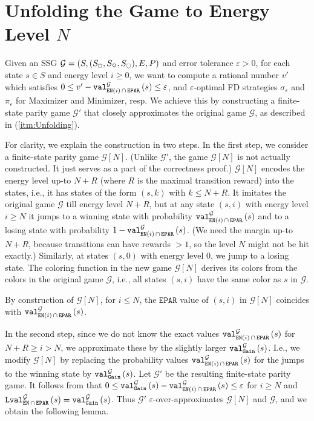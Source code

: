 \documentclass[a4paper,UKenglish,cleveref,autoref,thm-restate]{lipics-v2021}
\DeclareMathOperator{\Gain}{\mathtt{Gain}}
\newcommand{\Eparity}{\mathtt{EPAR}}
\newcommand{\en}{\mathtt{EN}}
\newcommand{\+}[1]{\mathbb{#1}}
\newcommand{\?}[1]{\mathcal{#1}}
\newcommand{\rsymbol}{\ocircle}
\newcommand{\zsymbol}{\Box}
\newcommand{\osymbol}{\Diamond}
\newcommand{\zstates}{\states_\zsymbol}
\newcommand{\rstates}{\states_\rsymbol}
\newcommand{\ostates}{\states_\osymbol}
\newcommand{\eps}{\varepsilon}
\newcommand{\lrb}[1]{\left[#1\right]}
\newcommand{\lrc}[1]{\left(#1\right)}
\newcommand{\tuple}[1]{\lrc{#1}}
\newcommand{\game}{{\mathcal G}}
\newcommand{\gametuple}{\tuple{\states,(\zstates,\ostates,\rstates),\transition,\probp}}
\newcommand{\states}{S}
\newcommand{\s}{s}
\newcommand{\transition}{{E}}
\newcommand{\probp}{P}
\newcommand{\zstrat}{\sigma}
\newcommand{\ostrat}{\pi}
\begin{document}
\section{Unfolding the Game to Energy Level  \texorpdfstring{$N$}{N}}\label{sec: Unfolding till N}

Given an SSG $\game = \gametuple$ and error tolerance $\eps >0$,
for each state $\s \in \states$ and energy level $i \ge 0$,
we want to compute a rational number
$v'$ which satisfies
$0 \le v'- \valueof[\game][\en(i)\, \cap \, \Eparity]{\s} \le \eps$,
and $\eps$-optimal FD strategies $\zstrat_\eps$ and $\ostrat_\eps$ for
Maximizer and Minimizer, resp.
We achieve this by constructing a finite-state parity game $\game'$
that closely approximates the original game $\game$,
as described in (\cref{itm:Unfolding}).

For clarity, we explain the construction in two steps.
In the first step, we consider a finite-state parity game $\game\lrb{N}$.
(Unlike $\game'$, the game $\game\lrb{N}$ is not actually constructed.
It just serves as a part of the correctness proof.)
$\game\lrb{N}$ encodes the energy level up-to $N+R$ (where $R$ is the maximal
transition reward) into the states, i.e., it has states
of the form $(\s,k)$ with $k \le N+R$.
It imitates the original game $\game$ till energy level $N+R$,
but at any state $\lrc{\s,i}$ with energy level $i \ge N$ it jumps
to a winning state with probability $\valueof[\game][\en(i)\, \cap \,
\Eparity]{\s}$ and to a losing state with probability
$1-\valueof[\game][\en(i)\, \cap \, \Eparity]{\s}$.
(We need the margin up-to $N+R$, because transitions can have rewards $>1$, so
the level $N$ might not be hit exactly.)
Similarly, at states $\lrc{\s,0}$ with energy level $0$,
we jump to a losing state.
The coloring function in the new game $\game\lrb{N}$
derives its colors from the colors in the original game
$\game$, i.e., all states $\lrc{\s,i}$ have the same color as $\s$ in $\game$.

By construction of $\game\lrb{N}$, for $i \le N$, the $\Eparity$ value of $\lrc{\s,i}$ in
$\game\lrb{N}$ coincides with $\valueof[\game][\en(i)\, \cap\, \Eparity]{\s}$.

In the second step, since we do not know the exact values
$\valueof[\game][\en(i)\, \cap \, \Eparity]{\s}$ for $N+R \ge i > N$,
we approximate these by the slightly larger $\valueof[\game][\Gain]{\s}$.
I.e., we modify $\game\lrb{N}$ by replacing the probability values
$\valueof[\game][\en(i)\, \cap \, \Eparity]{\s}$ for the jumps to the winning
state by $\valueof[\game][\Gain]{\s}$. Let $\game'$ be the resulting
finite-state parity game.
It follows from  that
$0 \le \valueof[\game][\Gain]{\s} -
\valueof[\game][\en(i)\,\cap\,\Eparity]{\s} \le \eps$ for $i \ge N$ and
$\limval[\game][\en\, \cap \, \Eparity]{\s} = \valueof[\game][\Gain]{\s}$.
Thus $\game'$ $\eps$-over-approximates $\game\lrb{N}$ and $\game$, and we obtain the
following lemma.
\end{document}
